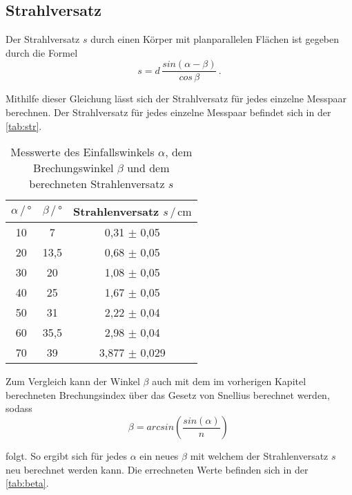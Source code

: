 \subsection{Strahlversatz}
Der Strahlversatz $s$ durch einen Körper mit planparallelen Flächen ist gegeben durch die Formel
\begin{equation}
    s = d \, \frac{sin(\alpha - \beta)}{cos \, \beta} \, .
\end{equation}

\noindent
Mithilfe dieser Gleichung lässt sich der Strahlversatz für jedes einzelne Messpaar berechnen. Der Strahlversatz für jedes einzelne Messpaar 
befindet sich in der \autoref{tab:str}.

\begin{table}
    \centering
    \caption{Messwerte des Einfallswinkels $\alpha$, dem Brechungswinkel $\beta$ und dem berechneten Strahlenversatz $s$}
    \label{tab:str}
    \begin{tabular}{c c c}
    \toprule
         $\alpha \, / \, ° $ & $\beta \, / \, °$ & Strahlenversatz $s  \, / \, \si{\centi\meter}$\\
    \midrule
    10 & 7    & 0,31  $\pm$  0,05\\
    20 & 13,5 & 0,68  $\pm$  0,05\\
    30 & 20   & 1,08  $\pm$  0,05\\
    40 & 25   & 1,67  $\pm$  0,05\\
    50 & 31   & 2,22  $\pm$  0,04\\
    60 & 35,5 & 2,98  $\pm$  0,04\\
    70 & 39   & 3,877 $\pm$  0,029\\
    \bottomrule
    \end{tabular}
\end{table}

\noindent
Zum Vergleich kann der Winkel $\beta$ auch mit dem im vorherigen Kapitel berechneten Brechungsindex über das Gesetz von Snellius berechnet werden, sodass 
\begin{equation}
    \beta = arcsin\left(\frac{sin(\alpha)}{n}\right) \, 
\end{equation}

\noindent
folgt.
So ergibt sich für jedes $\alpha$ ein neues $\beta$ mit welchem der Strahlenversatz $s$ neu berechnet werden kann. Die errechneten Werte befinden sich in der \autoref{tab:beta}.

